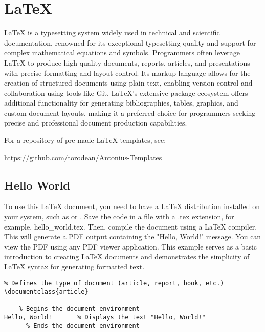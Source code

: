 \chapter{\LaTeX {}}
\thispagestyle{fancy}
\lstset{language=tex, style=latexstyle}

LaTeX is a typesetting system widely used in technical and scientific documentation, renowned for its exceptional typesetting quality and support for complex mathematical equations and symbols. Programmers often leverage LaTeX to produce high-quality documents, reports, articles, and presentations with precise formatting and layout control. Its markup language allows for the creation of structured documents using plain text, enabling version control and collaboration using tools like Git. LaTeX's extensive package ecosystem offers additional functionality for generating bibliographies, tables, graphics, and custom document layouts, making it a preferred choice for programmers seeking precise and professional document production capabilities.

\begin{urlbox}
For a repository of pre-made LaTeX templates, see:

\url{https://github.com/torodean/Antonius-Templates}
\end{urlbox}

\section{Hello World}

To use this LaTeX document, you need to have a LaTeX distribution installed on your system, such as  or . Save the code in a file with a .tex extension, for example, hello\_world.tex. Then, compile the document using a LaTeX compiler. This will generate a PDF output containing the "Hello, World!" message. You can view the PDF using any PDF viewer application. This example serves as a basic introduction to creating LaTeX documents and demonstrates the simplicity of LaTeX syntax for generating formatted text.

\begin{lstlisting}
% Defines the type of document (article, report, book, etc.)
\documentclass{article}

    % Begins the document environment
Hello, World!       % Displays the text "Hello, World!"
      % Ends the document environment
\end{lstlisting}









